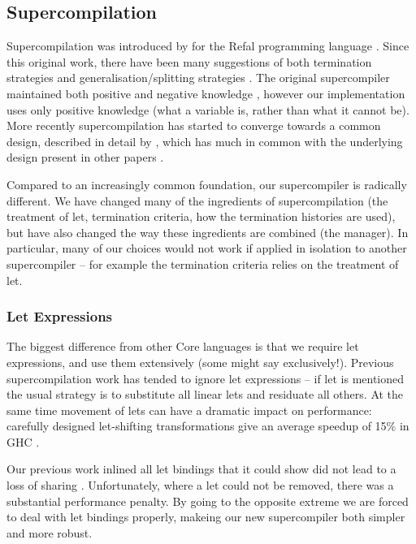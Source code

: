 \documentclass[draft]{sigplanconf}
\begin{document}
\subsection{Supercompilation}
\label{sec:comparison}

Supercompilation was introduced by \citet{supercompilation} for the Refal programming language \cite{refal}. Since this original work, there have been many suggestions of both termination strategies and generalisation/splitting strategies \cite{turchin:generalisation,sorensen:supercompilation,leuschel:homeomorphic}. The original supercompiler maintained both positive and negative knowledge \cite{secher:perfect_supercompilation}, however our implementation uses only positive knowledge (what a variable is, rather than what it cannot be). More recently supercompilation has started to converge towards a common design, described in detail by \citet{klyuchnikov:hosc}, which has much in common with the underlying design present in other papers \cite{me:supero,jonsson:supercompilation}.

Compared to an increasingly common foundation, our supercompiler is radically different. We have changed many of the ingredients of supercompilation (the treatment of let, termination criteria, how the termination histories are used), but have also changed the way these ingredients are combined (the manager). In particular, many of our choices would not work if applied in isolation to another supercompiler -- for example the termination criteria relies on the treatment of let.

\subsubsection{Let Expressions}

The biggest difference from other Core languages is that we require let expressions, and use them extensively (some might say exclusively!). Previous supercompilation work has tended to ignore let expressions -- if let is mentioned the usual strategy is to substitute all linear lets and residuate all others. At the same time movement of lets can have a dramatic impact on performance: carefully designed let-shifting transformations give an average speedup of 15\% in GHC \cite{spj:letfloating}.

Our previous work inlined all let bindings that it could show did not lead to a loss of sharing \cite{me:supero}. Unfortunately, where a let could not be removed, there was a substantial performance penalty. By going to the opposite extreme we are forced to deal with let bindings properly, makeing our new supercompiler both simpler and more robust.
\end{document}
